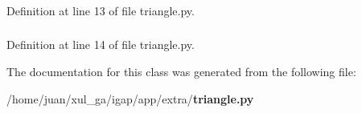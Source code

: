 \subsubsection{}\label{classtriangle_1_1myGLCanvas_e1144893605c31ec3c81a27c35a57ce8}




Definition at line 13 of file triangle.py.
\subsubsection{}\label{classtriangle_1_1myGLCanvas_491e92fdac6a8e02733542ff2a5af7cc}




Definition at line 14 of file triangle.py.

The documentation for this class was generated from the following file:\begin{CompactItemize}
\item 
/home/juan/xul\_\-ga/igap/app/extra/{\bf triangle.py}\end{CompactItemize}
